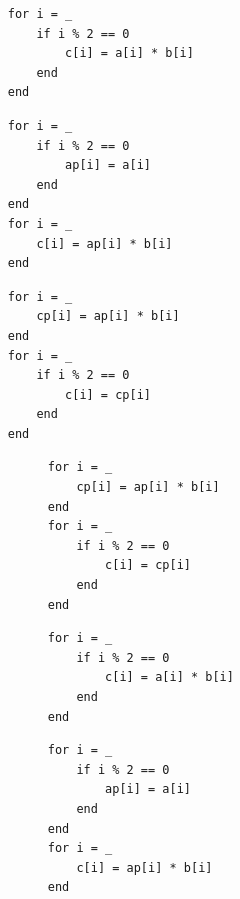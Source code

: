 \begin{minipage}{0.333\linewidth}
\begin{verbatim}
     for i = _
         if i % 2 == 0
             c[i] = a[i] * b[i]
         end
     end
\end{verbatim}
\end{minipage}%
\begin{minipage}{0.333\linewidth}
\begin{verbatim}
     for i = _
         if i % 2 == 0
             ap[i] = a[i]
         end
     end
     for i = _
         c[i] = ap[i] * b[i]
     end
\end{verbatim}
\end{minipage}%
\begin{minipage}{0.333\linewidth}
\begin{verbatim}
     for i = _
         cp[i] = ap[i] * b[i]
     end
     for i = _
         if i % 2 == 0
             c[i] = cp[i]
         end
     end
\end{verbatim}
\end{minipage}%

\begin{figure}
\begin{verbatim}
     for i = _
         cp[i] = ap[i] * b[i]
     end
     for i = _
         if i % 2 == 0
             c[i] = cp[i]
         end
     end
\end{verbatim}
\begin{verbatim}
     for i = _
         if i % 2 == 0
             c[i] = a[i] * b[i]
         end
     end
\end{verbatim}
\begin{verbatim}
     for i = _
         if i % 2 == 0
             ap[i] = a[i]
         end
     end
     for i = _
         c[i] = ap[i] * b[i]
     end
\end{verbatim}
\end{figure}




